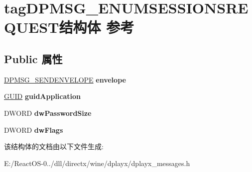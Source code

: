 \hypertarget{structtag_d_p_m_s_g___e_n_u_m_s_e_s_s_i_o_n_s_r_e_q_u_e_s_t}{}\section{tag\+D\+P\+M\+S\+G\+\_\+\+E\+N\+U\+M\+S\+E\+S\+S\+I\+O\+N\+S\+R\+E\+Q\+U\+E\+S\+T结构体 参考}
\label{structtag_d_p_m_s_g___e_n_u_m_s_e_s_s_i_o_n_s_r_e_q_u_e_s_t}
\subsection*{Public 属性}
\begin{DoxyCompactItemize}
\item 
\mbox{\label{structtag_d_p_m_s_g___e_n_u_m_s_e_s_s_i_o_n_s_r_e_q_u_e_s_t_abac6956caadeb4f4ccf827652fbe5790}} 
\hyperlink{structtag_d_p_m_s_g___s_e_n_d_e_n_v_e_l_o_p_e}{D\+P\+M\+S\+G\+\_\+\+S\+E\+N\+D\+E\+N\+V\+E\+L\+O\+PE} {\bfseries envelope}
\item 
\mbox{\label{structtag_d_p_m_s_g___e_n_u_m_s_e_s_s_i_o_n_s_r_e_q_u_e_s_t_ab23dc025e561e4090411d0950d21ac2d}} 
\hyperlink{interface_g_u_i_d}{G\+U\+ID} {\bfseries guid\+Application}
\item 
\mbox{\label{structtag_d_p_m_s_g___e_n_u_m_s_e_s_s_i_o_n_s_r_e_q_u_e_s_t_ae76f7e64f52aa7429013759e9751970d}} 
D\+W\+O\+RD {\bfseries dw\+Password\+Size}
\item 
\mbox{\label{structtag_d_p_m_s_g___e_n_u_m_s_e_s_s_i_o_n_s_r_e_q_u_e_s_t_aedbcb4a9a418e09422572de3758f48e1}} 
D\+W\+O\+RD {\bfseries dw\+Flags}
\end{DoxyCompactItemize}


该结构体的文档由以下文件生成\+:\begin{DoxyCompactItemize}
\item 
E\+:/\+React\+O\+S-\/0../dll/directx/wine/dplayx/dplayx\+\_\+messages.\+h\end{DoxyCompactItemize}
